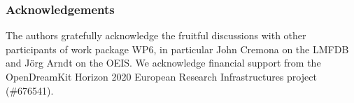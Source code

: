 
\subsubsection*{Acknowledgements}
The authors gratefully acknowledge the fruitful discussions with other participants of
work package WP6, in particular John Cremona on the LMFDB and J\"org Arndt on the OEIS. We
acknowledge financial support from the OpenDreamKit Horizon 2020 European Research
Infrastructures project (\#676541).


